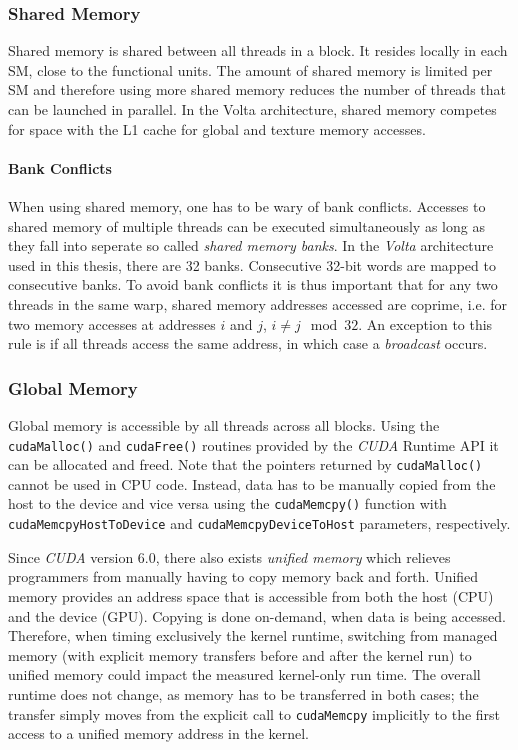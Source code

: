 \subsubsection{Shared Memory}
Shared memory is shared between all threads in a block. It resides locally in each SM, close to the functional units. The amount of shared memory is limited per SM and therefore using more shared memory reduces the number of threads that can be launched in parallel. In the Volta architecture, shared memory competes for space with the L1 cache for global and texture memory accesses.

\paragraph{Bank Conflicts} \label{sec:bank-conflicts}
When using shared memory, one has to be wary of bank conflicts. Accesses to shared memory of multiple threads can be executed simultaneously as long as they fall into seperate so called \emph{shared memory banks}. In the \emph{Volta} architecture used in this thesis, there are 32 banks. Consecutive 32-bit words are mapped to consecutive banks. To avoid bank conflicts it is thus important that for any two threads in the same warp, shared memory addresses accessed are coprime, i.e. for two memory accesses at addresses $i$ and $j$, $i \neq j \mod 32$. An exception to this rule is if all threads access the same address, in which case a \emph{broadcast} occurs.

\subsubsection{Global Memory}	\label{sec:unified-memory}
Global memory is accessible by all threads across all blocks. Using the \texttt{cudaMalloc()} and \texttt{cudaFree()} routines provided by the \emph{CUDA} Runtime API it can be allocated and freed. Note that the pointers returned by \texttt{cudaMalloc()} cannot be used in CPU code. Instead, data has to be manually copied from the host to the device and vice versa using the \texttt{cudaMemcpy()} function with \texttt{cudaMemcpyHostToDevice} and \texttt{cudaMemcpyDeviceToHost} parameters, respectively. 

Since \emph{CUDA} version 6.0, there also exists \emph{unified memory} which relieves programmers from manually having to copy memory back and forth. Unified memory provides an address space that is accessible from both the host (CPU) and the device (GPU). Copying is done on-demand, when data is being accessed. Therefore, when timing exclusively the kernel runtime, switching from managed memory (with explicit memory transfers before and after the kernel run) to unified memory could impact the measured kernel-only run time. The overall runtime does not change, as memory has to be transferred in both cases; the transfer simply moves from the explicit call to \texttt{cudaMemcpy} implicitly to the first access to a unified memory address in the kernel.


